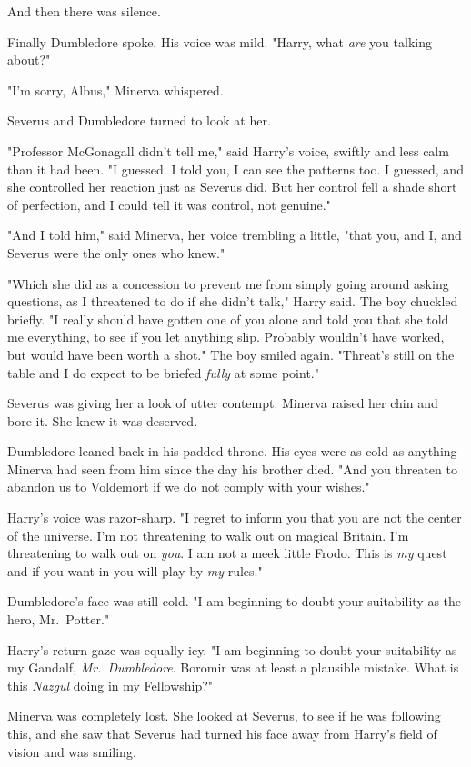 And then there was silence.

Finally Dumbledore spoke. His voice was mild. "Harry, what \emph{are} you 
talking about?"

"I'm sorry, Albus," Minerva whispered.

Severus and Dumbledore turned to look at her.

"Professor McGonagall didn't tell me," said Harry's voice, swiftly and less 
calm than it had been. "I guessed. I told you, I can see the patterns too. I 
guessed, and she controlled her reaction just as Severus did. But her control 
fell a shade short of perfection, and I could tell it was control, not genuine."

"And I told him," said Minerva, her voice trembling a little, "that you, and I, 
and Severus were the only ones who knew."

"Which she did as a concession to prevent me from simply going around asking 
questions, as I threatened to do if she didn't talk," Harry said. The boy 
chuckled briefly. "I really should have gotten one of you alone and told you 
that she told me everything, to see if you let anything slip. Probably wouldn't 
have worked, but would have been worth a shot." The boy smiled again. "Threat's 
still on the table and I do expect to be briefed \emph{fully} at some point."

Severus was giving her a look of utter contempt. Minerva raised her chin and 
bore it. She knew it was deserved.

Dumbledore leaned back in his padded throne. His eyes were as cold as anything 
Minerva had seen from him since the day his brother died. "And you threaten to 
abandon us to Voldemort if we do not comply with your wishes."

Harry's voice was razor-sharp. "I regret to inform you that you are not the 
center of the universe. I'm not threatening to walk out on magical Britain. I'm 
threatening to walk out on \emph{you}. I am not a meek little Frodo. This is 
\emph{my} quest and if you want in you will play by \emph{my} rules."

Dumbledore's face was still cold. "I am beginning to doubt your suitability as 
the hero, Mr.~Potter."

Harry's return gaze was equally icy. "I am beginning to doubt your suitability 
as my Gandalf, \emph{Mr.~Dumbledore}. Boromir was at least a plausible mistake. 
What is this \emph{Nazgul} doing in my Fellowship?"

Minerva was completely lost. She looked at Severus, to see if he was following 
this, and she saw that Severus had turned his face away from Harry's field of 
vision and was smiling.

